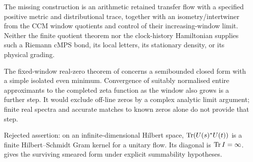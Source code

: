 \begin{observation}
\label{obs:ccm-tn-riemann-bond-open}
The missing construction is an arithmetic retained transfer flow with
a specified positive metric and distributional trace, together with
an isometry/intertwiner from the CCM window quotients and control of
their increasing-window limit. Neither the finite quotient theorem
nor the clock-history Hamiltonian supplies such a Riemann cMPS bond,
its local letters, its stationary density, or its physical grading.
\end{observation}

The fixed-window real-zero theorem of
\cite{connes2025quadratic} concerns a semibounded closed form with a
simple isolated even minimum. Convergence of suitably normalised
entire approximants to the completed zeta function as the window also
grows is a further step. It would exclude off-line zeros by a complex
analytic limit argument; finite real spectra and accurate matches to
known zeros alone do not provide that step.

\begin{observation}
\label{obs:ccm-tn-raw-infinite-gram}
Rejected assertion: on an infinite-dimensional Hilbert space,
$\operatorname{Tr}(U(s)^*U(t))$ is a finite Hilbert--Schmidt Gram kernel for a
unitary flow. Its diagonal is $\operatorname{Tr} I=\infty$.
 gives the surviving smeared
form under explicit summability hypotheses.
\end{observation}
